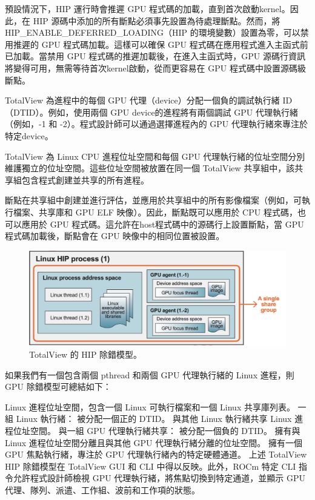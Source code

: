 預設情況下，HIP 運行時會推遲 GPU 程式碼的加載，直到首次啟動kernel。因此，在 HIP 源碼中添加的所有斷點必須事先設置為待處理斷點。然而，將 HIP\_ENABLE\_DEFERRED\_LOADING（HIP 的環境變數）設置為零，可以禁用推遲的 GPU 程式碼加載。這樣可以確保 GPU 程式碼在應用程式進入主函式前已加載。當禁用 GPU 程式碼的推遲加載後，在進入主函式時，GPU 源碼行資訊將變得可用，無需等待首次kernel啟動，從而更容易在 GPU 程式碼中設置源碼級斷點。

TotalView 為進程中的每個 GPU 代理（device）分配一個負的調試執行緒 ID（DTID）。例如，使用兩個 GPU device的進程將有兩個調試 GPU 代理執行緒（例如，-1 和 -2）。程式設計師可以通過選擇進程內的 GPU 代理執行緒來專注於特定device。

TotalView 為 Linux CPU 進程位址空間和每個 GPU 代理執行緒的位址空間分別維護獨立的位址空間。這些位址空間被放置在同一個 TotalView 共享組中，該共享組包含程式創建並共享的所有進程。

斷點在共享組中創建並進行評估，並應用於共享組中的所有影像檔案（例如，可執行檔案、共享庫和 GPU ELF 映像）。因此，斷點既可以應用於 CPU 程式碼，也可以應用於 GPU 程式碼。這允許在host程式碼中的源碼行上設置斷點，當 GPU 程式碼加載後，斷點會在 GPU 映像中的相同位置被設置。

\begin{figure}
    \centering
    \includegraphics[width=0.9\linewidth]{FileAusiliari/Screenshots/Figure13-24.png}
    \caption{TotalView 的 HIP 除錯模型。}
    \label{fig:PAPI24}
\end{figure}


如果我們有一個包含兩個 pthread 和兩個 GPU 代理執行緒的 Linux 進程，則 GPU 除錯模型可總結如下：

Linux 進程位址空間，包含一個 Linux 可執行檔案和一個 Linux 共享庫列表。
一組 Linux 執行緒：
被分配一個正的 DTID。
與其他 Linux 執行緒共享 Linux 進程位址空間。
與一組 GPU 代理執行緒共享：
被分配一個負的 DTID。
擁有與 Linux 進程位址空間分離且與其他 GPU 代理執行緒分離的位址空間。
擁有一個 GPU 焦點執行緒，專注於 GPU 代理執行緒內的特定硬體通道。
上述 TotalView HIP 除錯模型在 TotalView GUI 和 CLI 中得以反映。此外，ROCm 特定 CLI 指令允許程式設計師檢視 GPU 代理執行緒，將焦點切換到特定通道，並顯示 GPU 代理、隊列、派遣、工作組、波前和工作項的狀態。


